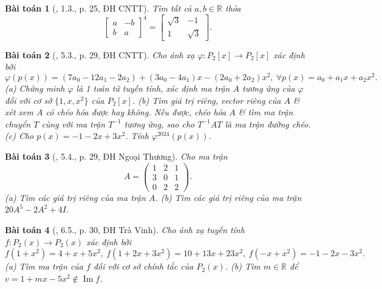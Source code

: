 \documentclass{article}
\newtheorem{baitoan}{Bài toán}
\begin{document}
\begin{baitoan}[\cite{VMS_VMC2024}, 1.3., p. 25, ĐH CNTT]
	Tìm tất cả $a,b\in\mathbb{R}$ thỏa
	\begin{equation*}
		\begin{bmatrix}
			a & -b\\b & a
		\end{bmatrix}^4 = \begin{bmatrix}
			\sqrt{3} & -1\\1 & \sqrt{3}
		\end{bmatrix}.
	\end{equation*}
\end{baitoan}

\begin{baitoan}[\cite{VMS_VMC2024}, 5.3., p. 29, ĐH CNTT]
	Cho ánh xạ $\varphi:P_2[x]\to P_2[x]$ xác định bởi
	\begin{equation*}
		\varphi(p(x)) = (7a_0 - 12a_1 - 2a_2) + (3a_0 - 4a_1)x - (2a_0 + 2a_2)x^2,\ \forall p(x) = a_0 + a_1x + a_2x^2.
	\end{equation*}
	(a) Chứng minh $\varphi$ là 1 toán tử tuyến tính, xác định ma trận $A$ tương ứng của $\varphi$ đối với cơ sở $\{1,x,x^2\}$ của $P_2[x]$. (b) Tìm giá trị riêng, vector riêng của $A$ \& xét xem $A$ có chéo hóa được hay không. Nếu được, chéo hóa $A$ \& tìm ma trận chuyển $T$ cùng với ma trận $T^{-1}$ tương ứng, sao cho $T^{-1}AT$ là ma trận đường chéo. (c) Cho $p(x) = -1 - 2x + 3x^2$. Tính $\varphi^{2024}(p(x))$.
\end{baitoan}

\begin{baitoan}[\cite{VMS_VMC2024}, 5.4., p. 29, ĐH Ngoại Thương]
	Cho ma trận
	\begin{equation*}
		A = \begin{pmatrix}
			1 & 2 & 1\\3 & 0 & 1\\0 & 2 & 2
		\end{pmatrix}.
	\end{equation*}
	(a) Tìm các giá trị riêng của ma trận $A$. (b) Tìm các giá trị riêng của ma trận $20A^5 - 2A^2 + 4I$.
\end{baitoan}

\begin{baitoan}[\cite{VMS_VMC2024}, 6.5., p. 30, ĐH Trà Vinh]
	Cho ánh xạ tuyến tính $f:P_2(x)\to P_2(x)$ xác định bởi
	\begin{equation*}
		f(1 + x^2) = 4 + x + 5x^2,\ f(1 + 2x + 3x^2) = 10 + 13x + 23x^2,\ f(-x + x^2) = -1 - 2x - 3x^2.
	\end{equation*}
	(a) Tìm ma trận của $f$ đối với cơ sở chính tắc của $P_2(x)$. (b) Tìm $m\in\mathbb{R}$ để $v = 1 + mx - 5x^2\notin\operatorname{Im}f$.
\end{baitoan}
\end{document}
